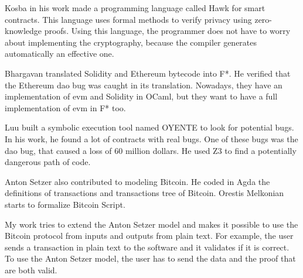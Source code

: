 Kosba \cite{kosba2016hawk} in his work made a programming language called Hawk for smart contracts.
This language uses formal methods to verify privacy using zero-knowledge proofs.
Using this language, the programmer does not have to worry about implementing the cryptography,
because the compiler generates automatically an effective one.

Bhargavan \cite{bhargavan2016formal} translated Solidity and Ethereum bytecode into F*.
He verified that the Ethereum \gls{dao} bug was caught in its translation.
Nowadays, they have an implementation of \gls{evm} and Solidity in OCaml,
but they want to have a full implementation of \gls{evm} in F* too.

Luu \cite{luu2016making} built a symbolic execution tool named OYENTE to look for potential bugs.
In his work, he found a lot of contracts with real bugs.
One of these bugs was the \gls{dao} bug, that caused a loss of 60 million dollars.
He used Z3 to find a potentially dangerous path of code.

Anton Setzer \cite{setzer2018modelling} also contributed to modeling Bitcoin.
He coded in Agda the definitions of transactions and
transactions tree of Bitcoin.
Orestis Melkonian starts to formalize Bitcoin Script.

My work tries to extend the Anton Setzer model and makes it possible to use the Bitcoin protocol
from inputs and outputs from plain text.
For example, the user sends a transaction in plain text to the software and it validates if it is correct.
To use the Anton Setzer model, the user has to send the data and the proof that are both valid.
